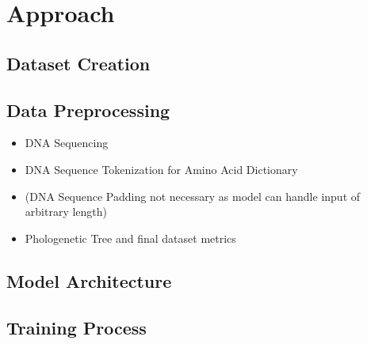 \section{Approach}  \label{approach}

\subsection{Dataset Creation}  \label{ch:approachA}

\subsection{Data Preprocessing}  \label{ch:approachB}

\begin{itemize}
	\item DNA Sequencing
	\item DNA Sequence Tokenization for Amino Acid Dictionary
	\item (DNA Sequence Padding not necessary as model can handle input of arbitrary length)
	\item Phologenetic Tree and final dataset metrics
\end{itemize}

\subsection{Model Architecture}  \label{ch:approachC}



\subsection{Training Process} \label{ch:approachD}


\newpage
